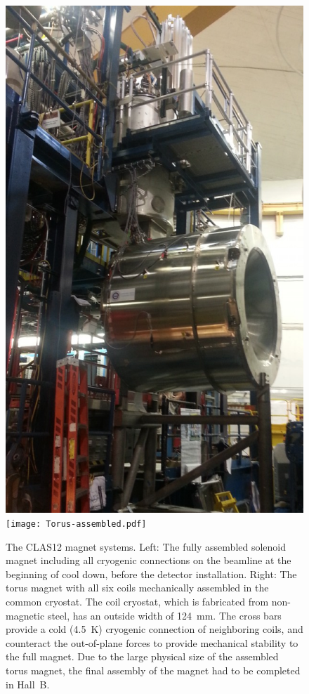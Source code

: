 \documentclass[final,3p,twocolumn]{elsarticle}
\begin{document}
\begin{figure}[th!]
\centerline{\includegraphics[width=0.65\columnwidth]{solenoid-magnet.png}
\texttt{[image: Torus-assembled.pdf]}}
\caption{The CLAS12 magnet systems. Left: The fully assembled solenoid magnet
  including all cryogenic connections on the beamline at the beginning of cool down, before the detector installation. 
  Right: The torus magnet with all six coils mechanically assembled in the
  common cryostat. The coil cryostat, which is fabricated from non-magnetic steel, has an outside width of 124~mm.
  The cross bars provide a cold (4.5~K) cryogenic connection of neighboring coils, and counteract the out-of-plane
  forces to provide mechanical stability to the full magnet. Due to the large physical size of the assembled torus
  magnet, the final assembly of the magnet had to be completed in Hall~B. }
\label{clas12-magnets}
\end{figure}
\end{document}
